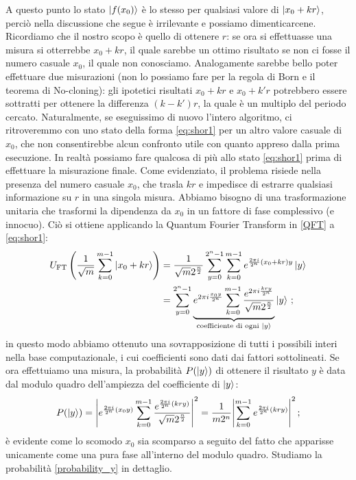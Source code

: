 A questo punto lo stato $\ket{f(x_0)}$ è lo stesso per qualsiasi valore di $\ket{x_0+kr}$, perciò nella discussione che segue è irrilevante e possiamo dimenticarcene. Ricordiamo che il nostro scopo è quello di ottenere $r$: se ora si effettuasse una misura si otterrebbe $x_0 + k r$, il quale sarebbe un ottimo risultato se non ci fosse il numero casuale $x_0$, il quale non conosciamo. Analogamente sarebbe bello poter effettuare due misurazioni (non lo possiamo fare per la regola di Born e il teorema di No-cloning): gli ipotetici risultati $x_0 + k r$ e $x_0 + k' r$ potrebbero essere sottratti per ottenere la differenza $(k-k')r$, la quale è un multiplo del periodo cercato. Naturalmente, se eseguissimo di nuovo l'intero algoritmo, ci ritroveremmo con uno stato della forma \eqref{eq:shor1} per un altro valore casuale di $x_0$, che non consentirebbe alcun confronto utile con quanto appreso dalla prima esecuzione. In realtà possiamo fare qualcosa di più allo stato \eqref{eq:shor1} prima di effettuare la misurazione finale. Come evidenziato, il problema risiede nella presenza del numero casuale $x_0$, che trasla $kr$ e impedisce di estrarre qualsiasi informazione su $r$ in una singola misura. Abbiamo bisogno di una trasformazione unitaria che trasformi la dipendenza da $x_0$ in un fattore di fase complessivo (e innocuo). Ciò si ottiene applicando la Quantum Fourier Transform in \eqref{QFT} a \eqref{eq:shor1}:
\begin{align*}
    U_{\text{FT}} \left( \frac{1}{\sqrt m}\sum_{k=0}^{m-1}\ket{x_0+kr} \right) &= \frac{1}{\sqrt{m}2^{\frac{n}{2}}} \sum_{y=0}^{2^n-1}\sum_{k=0}^{m-1}e^{\frac{2 \pi i}{2^n} (x_0+kr)y} \ket y \\
    &= \sum_{y=0}^{2^n-1} \underbrace{e^{2\pi i \frac{x_0 y}{2^n}}\sum_{k=0}^{m-1}\frac{e^{2\pi i \frac{kry}{2^n}}}{\sqrt{m}2^{\frac n2}}}_{\substack{\text{coefficiente di ogni } \ket{y}}} \ket y \, ;
\end{align*}
in questo modo abbiamo ottenuto una sovrapposizione di tutti i possibili interi nella base computazionale, i cui coefficienti sono dati dai fattori sottolineati. Se ora effettuiamo una misura, la probabilità $P( \ket{y})$ di ottenere il risultato $y$ è data dal modulo quadro dell'ampiezza del coefficiente di $\ket y$:
\begin{equation}\label{probability_y}
    P(\ket{y}) = \abs{ e^{\frac{2 \pi i}{2^n}(x_0 y)} \sum_{k=0}^{m-1}\frac{e^{\frac{2 \pi i}{2^n} (kry)}}{\sqrt{m}2^{\frac n2}}}^2 = \frac{1}{m2^n}\abs{\sum_{k=0}^{m-1}e^{\frac{2 \pi i}{2^n} (kry)}}^2 \, ;
\end{equation}
è evidente come lo scomodo $x_0$ sia scomparso a seguito del fatto che apparisse unicamente come una pura fase all'interno del modulo quadro. Studiamo la probabilità \eqref{probability_y} in dettaglio.

